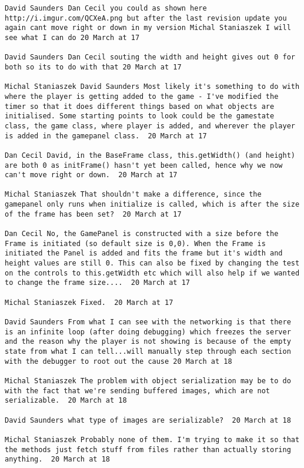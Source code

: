 \documentclass[10pt]{report}
\begin{document}
\begin{verbatim}
David Saunders ‎Dan Cecil you could as shown here
http://i.imgur.com/QCXeA.png but after the last revision update you
again cant move right or down in my version Michal Staniaszek I will
see what I can do 20 March at 17

David Saunders ‎Dan Cecil souting the width and height gives out 0 for
both so its to do with that 20 March at 17

Michal Staniaszek ‎David Saunders Most likely it's something to do with
where the player is getting added to the game - I've modified the
timer so that it does different things based on what objects are
initialised. Some starting points to look could be the gamestate
class, the game class, where player is added, and wherever the player
is added in the gamepanel class.  20 March at 17

Dan Cecil David, in the BaseFrame class, this.getWidth() (and height)
are both 0 as initFrame() hasn't yet been called, hence why we now
can't move right or down.  20 March at 17

Michal Staniaszek That shouldn't make a difference, since the
gamepanel only runs when initialize is called, which is after the size
of the frame has been set?  20 March at 17

Dan Cecil No, the GamePanel is constructed with a size before the
Frame is initiated (so default size is 0,0). When the Frame is
initiated the Panel is added and fits the frame but it's width and
height values are still 0. This can also be fixed by changing the test
on the controls to this.getWidth etc which will also help if we wanted
to change the frame size....  20 March at 17

Michal Staniaszek Fixed.  20 March at 17

David Saunders From what I can see with the networking is that there
is an infinite loop (after doing debugging) which freezes the server
and the reason why the player is not showing is because of the empty
state from what I can tell...will manually step through each section
with the debugger to root out the cause 20 March at 18

Michal Staniaszek The problem with object serialization may be to do
with the fact that we're sending buffered images, which are not
serializable.  20 March at 18

David Saunders what type of images are serializable?  20 March at 18

Michal Staniaszek Probably none of them. I'm trying to make it so that
the methods just fetch stuff from files rather than actually storing
anything.  20 March at 18


\end{verbatim}
\end{document}
